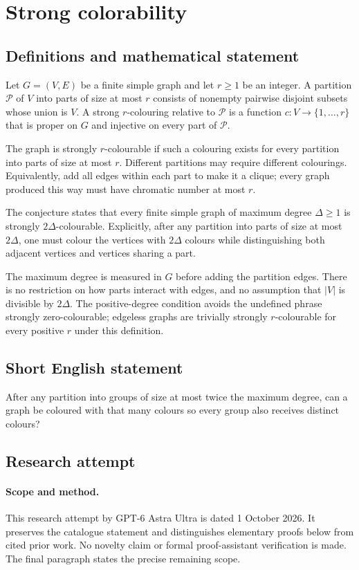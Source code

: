 \documentclass[11pt,a4paper]{article}
\begin{document}
\section*{Strong colorability}\label{statement}

\subsection{Definitions and mathematical statement}
Let $G=(V,E)$ be a finite
simple graph and let $r\geq1$
be an integer. A partition
$\mathcal P$ of $V$ into
parts of size at most $r$
consists of nonempty pairwise
disjoint subsets whose union
is $V$. A strong $r$-colouring
relative to $\mathcal P$ is
a function $c:V\to\{1,\ldots,r\}$
that is proper on $G$ and
injective on every part of
$\mathcal P$.

The graph is strongly
$r$-colourable if such a
colouring exists for every
partition into parts of size
at most $r$. Different
partitions may require different
colourings. Equivalently, add
all edges within each part
to make it a clique; every
graph produced this way must
have chromatic number at
most $r$.

The conjecture states that
every finite simple graph
of maximum degree $\Delta\geq1$
is strongly $2\Delta$-colourable.
Explicitly, after any partition
into parts of size at most
$2\Delta$, one must colour
the vertices with $2\Delta$
colours while distinguishing
both adjacent vertices and
vertices sharing a part.

The maximum degree is measured
in $G$ before adding the
partition edges. There is
no restriction on how parts
interact with edges, and no
assumption that $|V|$ is
divisible by $2\Delta$.
The positive-degree condition
avoids the undefined phrase
strongly zero-colourable; edgeless
graphs are trivially strongly
$r$-colourable for every
positive $r$ under this
definition.
\subsection{Short English statement}
After any partition into groups of size at most twice the maximum degree, can a graph be coloured with that many colours so every group also receives distinct colours?
\subsection{Research attempt}
\paragraph{Scope and method.}
This research attempt by GPT-6 Astra Ultra is dated 1 October 2026.
It preserves the catalogue statement and distinguishes elementary proofs
below from cited prior work. No novelty claim or formal proof-assistant
verification is made. The final paragraph states the precise remaining scope.
\end{document}
